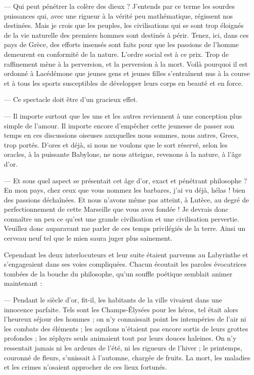 \documentclass[a4paper, 11pt, oneside, polutonikogreek, french]{article}
\begin{document}
--- Qui peut pénétrer la colère des dieux ? J'entends par ce terme les sourdes puissances qui, avec une rigueur à la vérité peu mathématique, régissent nos destinées. Mais je crois que les peuples, les civilisations qui se sont trop éloignés de la vie naturelle des premiers hommes sont destinés à périr. Tenez, ici, dans ces pays de Grèce, des efforts insensés sont faits pour que les passions de l'homme demeurent en conformité de la nature. L'ordre social est à ce prix. Trop de raffinement mène à la perversion, et la perversion à la mort. Voilà pourquoi il est ordonné à Lacédémone que jeunes gens et jeunes filles s'entraînent nus à la course et à tous les sports susceptibles de développer leurs corps en beauté et en force.

--- Ce spectacle doit être d'un gracieux effet.

--- Il importe surtout que les uns et les autres reviennent à une conception plus simple de l'amour. Il importe encore d'empêcher cette jeunesse de passer son temps en ces discussions oiseuses auxquelles nous sommes, nous autres, Grecs, trop portés. D'ores et déjà, si nous ne voulons que le sort réservé, selon les oracles, à la puissante Babylone, ne nous atteigne, revenons à la nature, à l'âge d'or.

\bigskip
\centerline{\EightStarTaper}
\centerline{\EightStarTaper\EightStarTaper}
\bigskip

--- Et sous quel aspect se présentait cet âge d'or, exact et pénétrant philosophe ? En mon pays, chez ceux que vous nommez les barbares, j'ai vu déjà, hélas ! bien des passions déchaînées. Et nous n'avons même pas atteint, à Lutèce, au degré de perfectionnement de cette Marseille que vous avez fondée ! Je devrais donc connaître un peu ce qu'est une grande civilisation et une civilisation pervertie. Veuillez donc auparavant me parler de ces temps privilégiés de la terre. Ainsi un cerveau neuf tel que le mien saura juger plus sainement.

Cependant les deux interlocuteurs et leur suite étaient parvenus au Labyrinthe et s'engageaient dans ses voies compliquées. Chacun écoutait les paroles évocatrices tombées de la bouche du philosophe, qu'un souffle poétique semblait animer maintenant :

--- Pendant le siècle d'or, fit-il, les habitants de la ville vivaient dans une innocence parfaite. Tels sont les Champs-Élysées pour les héros, tel était alors l'heureux séjour des hommes ; on n'y connaissait point les intempéries de l'air ni les combats des éléments ; les aquilons n'étaient pas encore sortis de leurs grottes profondes ; les zéphyrs seuls animaient tout par leurs douces haleines. On n'y ressentait jamais ni les ardeurs de l'été, ni les rigueurs de l'hiver ; le printemps, couronné de fleurs, s'unissait à l'automne, chargée de fruits. La mort, les maladies et les crimes n'osaient approcher de ces lieux fortunés.
\end{document}
